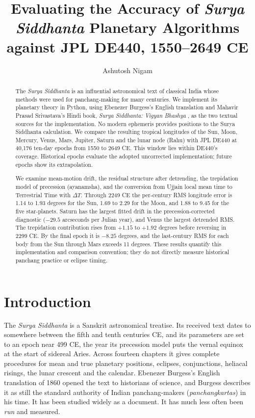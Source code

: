 \documentclass[11pt,a4paper]{article}
\title{Evaluating the Accuracy of \textit{Surya Siddhanta} Planetary Algorithms against JPL DE440, 1550--2649 CE}
\author{Ashutosh Nigam}
\date{}
\newcommand{\SuSi}{\textit{Surya Siddhanta}}
\newcommand{\dT}{$\Delta T$}
\begin{document}
\maketitle

\begin{abstract}
The \SuSi{} is an influential astronomical text of classical India whose methods were used for panchang-making for many centuries. We implement its planetary theory in Python, using Ebenezer Burgess's English translation \citep{burgess1860} and Mahavir Prasad Srivastava's Hindi book, \textit{Surya Siddhanta: Vigyan Bhashya} \citep{shrivastava}, as the two textual sources for the implementation. No modern ephemeris provides positions to the Surya Siddhanta calculation. We compare the resulting tropical longitudes of the Sun, Moon, Mercury, Venus, Mars, Jupiter, Saturn and the lunar node (Rahu) with JPL DE440 at 40,176 ten-day epochs from 1550 to 2649 CE. This window lies within DE440's coverage. Historical epochs evaluate the adopted uncorrected implementation; future epochs show its extrapolation.

We examine mean-motion drift, the residual structure after detrending, the trepidation model of precession (ayanamsha), and the conversion from Ujjain local mean time to Terrestrial Time with \dT{}. Through 2249 CE the per-century RMS longitude error is 1.14 to 1.93 degrees for the Sun, 1.69 to 2.29 for the Moon, and 1.88 to 9.45 for the five star-planets. Saturn has the largest fitted drift in the precession-corrected diagnostic ($-29.5$ arcseconds per Julian year), and Venus the largest detrended RMS. The trepidation contribution rises from $+1.15$ to $+1.92$ degrees before reversing in 2299 CE. By the final epoch it is $-8.25$ degrees, and the last-century RMS for each body from the Sun through Mars exceeds 11 degrees. These results quantify this implementation and comparison convention; they do not directly measure historical panchang practice or eclipse timing.
\end{abstract}

\section{Introduction}

The \SuSi{} is a Sanskrit astronomical treatise. Its received text dates to somewhere between the fifth and tenth centuries CE, and its parameters are set to an epoch near 499 CE, the year its precession model puts the vernal equinox at the start of sidereal Aries. Across fourteen chapters it gives complete procedures for mean and true planetary positions, eclipses, conjunctions, heliacal risings, the lunar crescent and the calendar. Ebenezer Burgess's English translation of 1860 opened the text to historians of science, and Burgess describes it as still the standard authority of Indian panchang-makers (\textit{panchangkartas}) in his time. It has been studied widely as a document. It has much less often been \emph{run} and measured.
\end{document}
